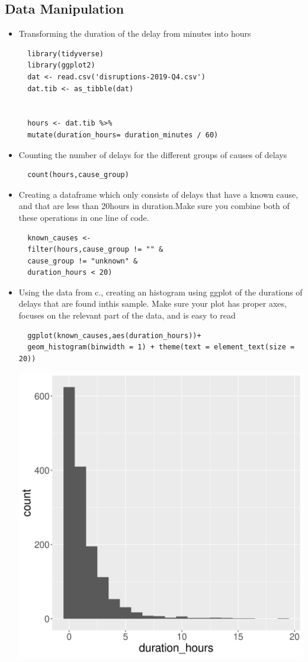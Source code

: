 \documentclass[11pt]{article}
\begin{document}
\subsection{Data Manipulation}
\label{sec:orgdaa9a80}
\begin{itemize}
\item Transforming the duration of the delay from minutes into hours
\begin{verbatim}
  library(tidyverse)
  library(ggplot2)
  dat <- read.csv('disruptions-2019-Q4.csv')
  dat.tib <- as_tibble(dat)


  hours <- dat.tib %>%
  mutate(duration_hours= duration_minutes / 60)
\end{verbatim}
\item Counting the number of delays for the different groups of causes of delays
\begin{verbatim}
  count(hours,cause_group)
\end{verbatim}
\item Creating a dataframe which only consists of delays that have a known cause, and that are less than 20hours in duration.Make sure you combine both of these operations in one line of code.

\begin{verbatim}
  known_causes <-
  filter(hours,cause_group != "" &
  cause_group != "unknown" &
  duration_hours < 20)
\end{verbatim}
\item Using the data from c., creating an histogram using ggplot of the durations of delays that are found inthis sample. Make sure your plot has proper axes, focuses on the relevant part of the data, and is easy to read
\begin{verbatim}
  ggplot(known_causes,aes(duration_hours))+
  geom_histogram(binwidth = 1) + theme(text = element_text(size = 20))
\end{verbatim}
\begin{center}
  \includegraphics[width=.9\linewidth]{known_causes.jpg}
\end{center}
\end{itemize}
\end{document}
